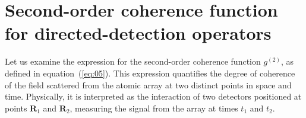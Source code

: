 \documentclass[aps,prl,twocolumn,superscriptaddress,showpacs,amsmath,amssymb]{revtex4-2}
\begin{document}
%
%
%
%
%

\section{Second-order coherence function for directed-detection operators}

Let us examine the expression for the second-order coherence function $g^{(2)}$, as defined in equation~(\ref{eq:05}). This expression quantifies the degree of coherence of the field scattered from the atomic array at two distinct points in space and time. Physically, it is interpreted as the interaction of two detectors positioned at points $\mathbf{R}_1$ and $\mathbf{R}_2$, measuring the signal from the array at times $t_1$ and $t_2$.
\end{document}
